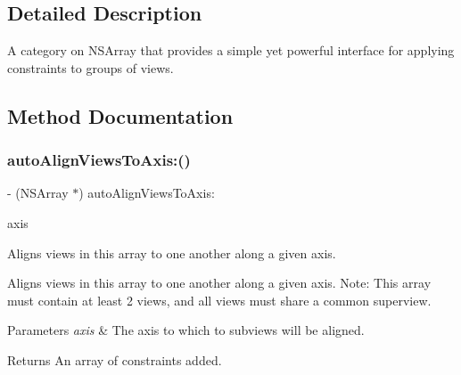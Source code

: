 \subsection{Detailed Description}
A category on N\+S\+Array that provides a simple yet powerful interface for applying constraints to groups of views. 

\subsection{Method Documentation}
\mbox{\label{category_n_s_array_07_auto_layout_08_a56546bae073c0f492176b7cf1d023f2c}} 
\subsubsection{\texorpdfstring{auto\+Align\+Views\+To\+Axis\+:()}{autoAlignViewsToAxis:()}}
{\footnotesize\ttfamily -\/ (N\+S\+Array $\ast$) auto\+Align\+Views\+To\+Axis\+: \begin{DoxyParamCaption}\item[{(A\+L\+Axis)}]{axis }\end{DoxyParamCaption}}

Aligns views in this array to one another along a given axis.

Aligns views in this array to one another along a given axis. Note\+: This array must contain at least 2 views, and all views must share a common superview.


\begin{DoxyParams}{Parameters}
{\em axis} & The axis to which to subviews will be aligned. \\
\hline
\end{DoxyParams}
\begin{DoxyReturn}{Returns}
An array of constraints added. 
\end{DoxyReturn}
\mbox{\label{category_n_s_array_07_auto_layout_08_a3ee97fb9058e640aa3f7df1e6595a118}} 
